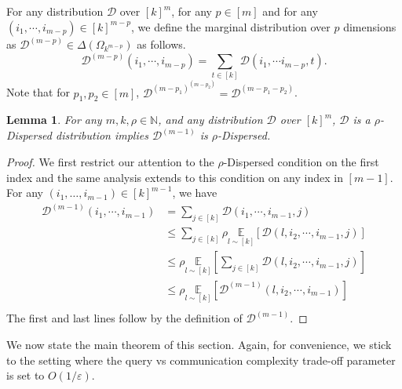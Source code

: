 \documentclass[10pt,a4paper]{article}
\newtheorem{lemma}[theorem]{Lemma}
\newcommand{\sD}{\mathcal{D}}
\newcommand{\eps}{\varepsilon}
\begin{document}
For any distribution $\sD$ over $[k]^{m}$, for any $p\in [m]$ and for any $(i_{1},\cdots,i_{m-p})\in [k]^{m-p}$, we define the marginal distribution over $p$ dimensions as  $\mathcal{D}^{(m-p)}\in \Delta(\Omega_{k^{m-p}})$ as follows.
\begin{equation*}
    \sD^{(m-p)}(i_{1},\cdots, i_{m-p})=\sum_{t\in [k]}\sD(i_{1},\cdots i_{m-p},t).
\end{equation*}
\noindent Note that for $p_{1},p_{2}\in [m]$, $\sD^{(m-p_{1})^{(m-p_{2})}}=\sD^{(m-p_{1}-p_{2})}$.

\begin{lemma}\label{lem:fold_dispersed}
    For any $m,k,\rho\in \mathbb{N}$, and any distribution $\sD$ over $[k]^{m}$, $\sD$ is a $\rho$-Dispersed distribution implies $\sD^{(m-1)}$ is $\rho$-Dispersed.
\end{lemma}

\begin{proof}
    We first restrict our attention to the $\rho$-Dispersed condition on the first index and the same analysis extends to this condition on any index in $[m-1]$. For any $(i_1, \dots, i_{m-1}) \in [k]^{m-1}$, we have
    \[
    \begin{split}
        \sD^{(m-1)}(i_{1},\cdots, i_{m-1})&=\sum_{j\in [k]}\sD(i_{1},\cdots, i_{m-1},j)\\
        &\leq \sum_{j\in [k]}\rho\underset{{l\sim [k]}}{\mathbb{E}}[\sD(l,i_{2},\cdots, i_{m-1}, j)]\\
        &\leq \rho\underset{{l\sim [k]}}{\mathbb{E}}\left[\sum_{j\in [k]}\sD(l,i_{2},\cdots, i_{m-1}, j)\right]\\
        & \leq\rho \underset{{l\sim [k]}}{\mathbb{E}}[\sD^{(m-1)}(l,i_{2},\cdots, i_{m-1})]\\
    \end{split}
    \]
    The first and last lines follow by the definition of $\sD^{(m-1)}$. 
\end{proof}

\noindent We now state the main theorem of this section. Again, for convenience, we stick to the setting where the query vs communication complexity trade-off parameter is set to $O(1/\eps)$. 
\end{document}
